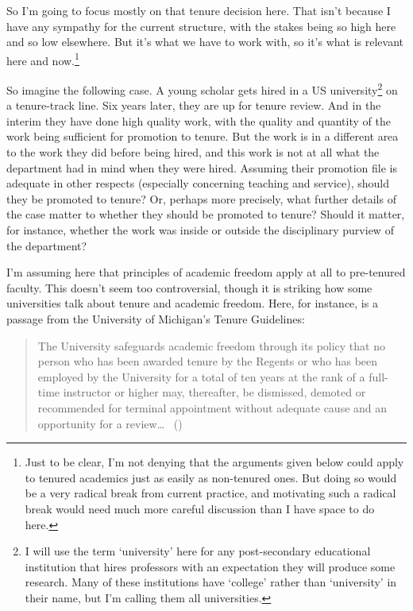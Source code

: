 \documentclass[
  11pt,
  letterpaper,
  DIV=11,
  numbers=noendperiod,
  twoside]{scrartcl}
\begin{document}
So I'm going to focus mostly on that tenure decision here. That isn't
because I have any sympathy for the current structure, with the stakes
being so high here and so low elsewhere. But it's what we have to work
with, so it's what is relevant here and now.\footnote{Just to be clear,
  I'm not denying that the arguments given below could apply to tenured
  academics just as easily as non-tenured ones. But doing so would be a
  very radical break from current practice, and motivating such a
  radical break would need much more careful discussion than I have
  space to do here.}

So imagine the following case. A young scholar gets hired in a US
university\footnote{I will use the term `university' here for any
  post-secondary educational institution that hires professors with an
  expectation they will produce some research. Many of these
  institutions have `college' rather than `university' in their name,
  but I'm calling them all universities.} on a tenure-track line. Six
years later, they are up for tenure review. And in the interim they have
done high quality work, with the quality and quantity of the work being
sufficient for promotion to tenure. But the work is in a different area
to the work they did before being hired, and this work is not at all
what the department had in mind when they were hired. Assuming their
promotion file is adequate in other respects (especially concerning
teaching and service), should they be promoted to tenure? Or, perhaps
more precisely, what further details of the case matter to whether they
should be promoted to tenure? Should it matter, for instance, whether
the work was inside or outside the disciplinary purview of the
department?

I'm assuming here that principles of academic freedom apply at all to
pre-tenured faculty. This doesn't seem too controversial, though it is
striking how some universities talk about tenure and academic freedom.
Here, for instance, is a passage from the University of Michigan's
Tenure Guidelines:

\begin{quote}
The University safeguards academic freedom through its policy that no
person who has been awarded tenure by the Regents or who has been
employed by the University for a total of ten years at the rank of a
full-time instructor or higher may, thereafter, be dismissed, demoted or
recommended for terminal appointment without adequate cause and an
opportunity for a review\ldots{} ~()
\end{quote}
\end{document}
